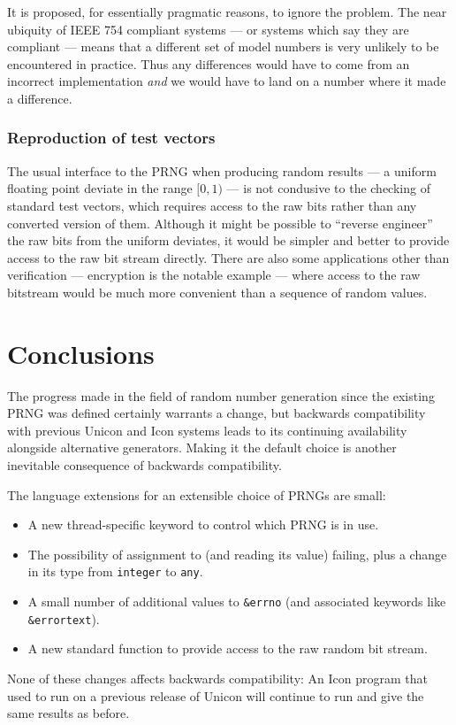 \documentclass[letterpaper,12pt]{article}
\begin{document}
It is proposed, for essentially pragmatic reasons, to ignore the
problem. The near ubiquity of IEEE 754 compliant systems --- or systems
which say they are compliant --- means that a different set of model
numbers is very unlikely to be encountered in practice. Thus any
differences would have to come from an incorrect implementation {\em and}
we would have to land on a number where it made a difference.
    
\subsubsection{Reproduction of test vectors}

\label{rawBits}
The usual interface to the PRNG when producing random results --- a uniform
floating point deviate in the range $[0,1)$ --- is not condusive to the
checking of standard test vectors, which requires access to the raw bits
rather than any converted version of them. Although it might be possible to
``reverse engineer'' the raw bits from the uniform deviates, it would be
simpler and better to provide access to the raw bit stream directly. There
are also some applications other than verification --- encryption is the
notable example --- where access to the raw bitstream would be much more
convenient than a sequence of random values.

\section{Conclusions}

The progress made in the field of random number generation since the
existing PRNG was defined certainly warrants a change, but backwards
compatibility with previous Unicon and Icon systems leads to its
continuing availability alongside alternative generators. Making it
the default choice is another inevitable consequence of backwards
compatibility.

The language extensions for an extensible choice of PRNGs are small:
\begin{itemize}
\item A new thread-specific keyword \rndlibkwd to control which PRNG is in use.
\item The possibility of assignment to \rndkwd (and reading its value)
  failing, plus a change in its type from \texttt{integer} to \texttt{any}.
\item A small number of additional values to \texttt{\&errno} (and
  associated keywords like \texttt{\&errortext}).
\item A new standard function to provide access to the raw random bit stream.
\end{itemize}
None of these changes affects backwards compatibility: An Icon program that
used to run on a previous release of Unicon will continue to run and give
the same results as before.
\end{document}
